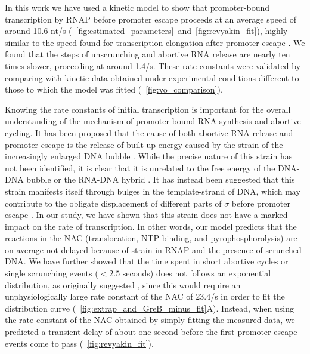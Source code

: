 %
In this work we have used a kinetic model to show that promoter-bound
transcription by RNAP before promoter escape proceeds at an average speed of
around 10.6 nt/s
(\FIGS~\ref{fig:estimated_parameters}~and~\ref{fig:revyakin_fit}), highly
similar to the speed found for transcription elongation after promoter escape
\cite{revyakin_abortive_2006}. We found that the steps of unscrunching and
abortive RNA release are nearly ten times slower, proceeding at around 1.4/s.
These rate constants were validated by comparing with kinetic data obtained
under experimental conditions different to those to which the model was fitted
(\FIG~\ref{fig:vo_comparison}).

Knowing the rate constants of initial transcription is important for the
overall understanding of the mechanism of promoter-bound RNA synthesis and
abortive cycling. It has been proposed that the cause of both abortive RNA
release and promoter escape is the release of built-up energy caused by the
strain of the increasingly enlarged DNA bubble \cite{straney_stressed_1987,
hsu_promoter_2002, revyakin_abortive_2006}. While the precise nature of this
strain has not been identified, it is clear that it is unrelated to the free
energy of the DNA-DNA bubble or the RNA-DNA hybrid \cite{hsu_initial_2006,
skancke_sequence-dependent_2015}. It has instead been suggested that this
strain manifests itself through bulges in the template-strand of DNA, which
may contribute to the obligate displacement of different parts of $\sigma$
before promoter escape \cite{winkelman_crosslink_2015}. In our study, we have
shown that this strain does not have a marked impact on the rate of
transcription. In other words, our model predicts that the reactions in the
NAC (translocation, NTP binding, and pyrophosphorolysis) are on average not
delayed because of strain in RNAP and the presence of scrunched DNA. We have
further showed that the time spent in short abortive cycles or single
scrunching events ($< 2.5$ seconds) does not follows an exponential
distribution, as originally suggested
\cite{revyakin_abortive_2006}, since this would require an unphysiologically
large rate constant of the NAC of 23.4/s in order to fit the
distribution curve (\FIG~\ref{fig:extrap_and_GreB_minus_fit}A). Instead, when
using the rate constant of the NAC obtained by simply fitting the measured
data, we predicted a transient delay of about one second before the first
promoter escape events come to pass (\FIG~\ref{fig:revyakin_fit}).

